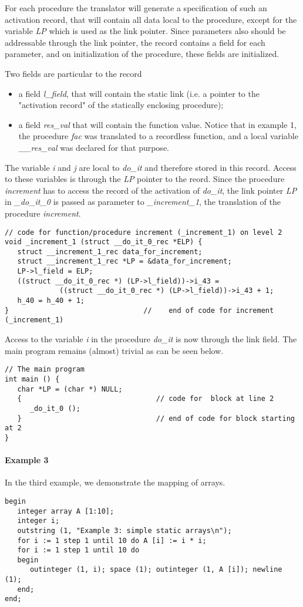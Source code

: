 \documentclass[11pt]{article}
\begin{document}
For each procedure
the translator will generate a specification of such an activation record,
that will contain all data local to the procedure, except for the variable
{\em LP} which is used as the link pointer.
Since parameters also should be addressable through the link pointer,
the record contains a field for each parameter, and on initialization
of the procedure, these fields are initialized.

Two fields are particular to the record
\begin{itemize}
\item a field {\em l\_field}, that will contain the static link (i.e. a pointer
to the "activation record" of the statically enclosing procedure);
\item a field {\em res\_val} that will contain the function value. Notice
that in example 1, the procedure {\em fac} was translated to a recordless function,
and a local variable {\em \_\_res\_val} was declared for that purpose.
\end{itemize}
The variable {\em i} and {\em j} are local to {\em do\_it} and therefore
stored
in this record.
Access to these variables is through the {\em LP} pointer to the reord.
Since the procedure {\em increment} has to access the record of the activation of {\em do\_it},
the link pointer {\em LP} in {\em \_do\_it\_0}
is passed as parameter to {\em \_increment\_1},
the translation of the procedure {\em increment}.
{\footnotesize
\begin{verbatim}
// code for function/procedure increment (_increment_1) on level 2
void _increment_1 (struct __do_it_0_rec *ELP) {
   struct __increment_1_rec data_for_increment;
   struct __increment_1_rec *LP = &data_for_increment;
   LP->l_field = ELP;
   ((struct __do_it_0_rec *) (LP->l_field))->i_43 =
             ((struct __do_it_0_rec *) (LP->l_field))->i_43 + 1;
   h_40 = h_40 + 1;
}                                //    end of code for increment (_increment_1)
\end{verbatim}
}
Access to the variable {\em i} in the procedure {\em do\_it}
is now through the link field.  The main program remains (almost) trivial as can
be seen below.
{\footnotesize
\begin{verbatim}
// The main program
int main () {
   char *LP = (char *) NULL;
   {                                // code for  block at line 2 
      _do_it_0 ();
   }                                // end of code for block starting at 2
}
\end{verbatim}
}

\paragraph{Example 3}
In the third example, we demonstrate the mapping of arrays.
{\footnotesize
\begin{verbatim}
begin
   integer array A [1:10];
   integer i;
   outstring (1, "Example 3: simple static arrays\n");
   for i := 1 step 1 until 10 do A [i] := i * i;
   for i := 1 step 1 until 10 do
   begin
      outinteger (1, i); space (1); outinteger (1, A [i]); newline (1);
   end;
end;
\end{verbatim}
}
\end{document}
